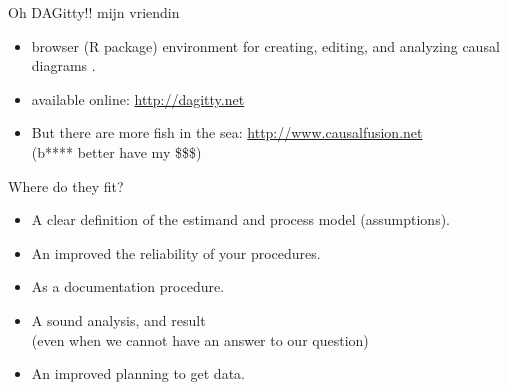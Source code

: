\begin{frame}
\begin{columns}
\begin{column}{0.5\textwidth}
\begin{figure}
			\end{figure}
			\begin{figure}
			\end{figure}
		\end{column}
	\end{columns}
\end{frame}
%
%
\begin{lhframe}[rhgraphic={\texttt{[image: DAGitty.png]}}]
	{Oh DAGitty!! mijn vriendin}
	
	\begin{itemize}
		\item browser (R package) environment for creating, editing, and analyzing causal diagrams \cite{Textor_et_al_2016}.
		\item available online: \textcolor{blue}{\url{http://dagitty.net}}
		\item But there are more fish in the sea: \textcolor{blue}{\url{http://www.causalfusion.net}} \cite{Bareinboim_et_al_2016} \\
		{\small (b**** better have my \$\$\$)}
	\end{itemize}
\end{lhframe}
%
%
\begin{lhframe}[rhgraphic={\texttt{[image: DAG\_to\_research.png]}}]
	{Where do they fit?}
	\begin{itemize}
		\item A clear definition of the estimand and process model (assumptions).
		\item An improved the reliability of your procedures.
		\item As a documentation procedure.
	\end{itemize}
	\begin{itemize}
		\item A sound analysis, and result \\
		{\small \alert{(even when we cannot have an answer to our question)} }
		\item An improved planning to get data.
	\end{itemize}
\end{lhframe}
%
%